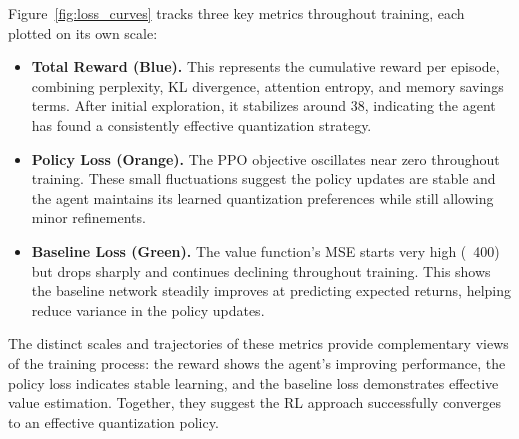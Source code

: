 \documentclass{article}
\begin{document}
	Figure~\ref{fig:loss_curves} tracks three key metrics throughout training, each plotted on its own scale:
	\begin{itemize}
		\item \textbf{Total Reward (Blue).} 
		This represents the cumulative reward per episode, combining perplexity, KL divergence, attention entropy, and memory savings terms. After initial exploration, it stabilizes around 38, indicating the agent has found a consistently effective quantization strategy.
		
		\item \textbf{Policy Loss (Orange).} 
		The PPO objective oscillates near zero throughout training. These small fluctuations suggest the policy updates are stable and the agent maintains its learned quantization preferences while still allowing minor refinements.
		
		\item \textbf{Baseline Loss (Green).}		
		The value function's MSE starts very high (~400) but drops sharply and continues declining throughout training. This shows the baseline network steadily improves at predicting expected returns, helping reduce variance in the policy updates.
	\end{itemize}
	
	The distinct scales and trajectories of these metrics provide complementary views of the training process: the reward shows the agent's improving performance, the policy loss indicates stable learning, and the baseline loss demonstrates effective value estimation. Together, they suggest the RL approach successfully converges to an effective quantization policy.
	
\end{document}

